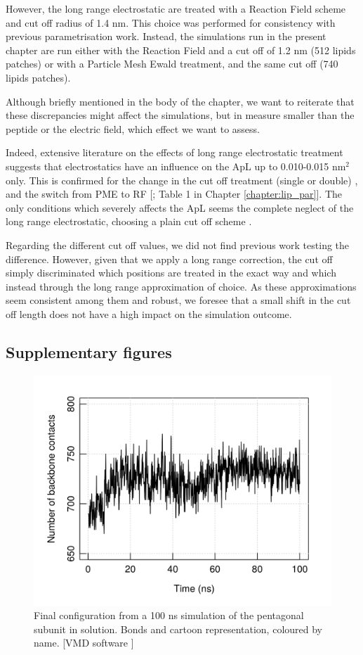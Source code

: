 However, the long range electrostatic are treated with a Reaction Field scheme and cut off radius of 1.4 nm. This choice was performed for consistency with previous parametrisation work.
%
Instead, the simulations run in the present chapter are run either with the Reaction Field and a cut off of 1.2 nm (512 lipids patches) or with a Particle Mesh Ewald treatment, and the same cut off (740 lipids patches).

Although briefly mentioned in the body of the chapter, we want to reiterate that these discrepancies might affect the simulations, but in measure smaller than the peptide or the electric field, which effect we want to assess.

Indeed, extensive literature on the effects of long range electrostatic treatment suggests that electrostatics have an influence on the ApL up to 0.010-0.015 nm$^2$ only. This is confirmed for the change in the cut off treatment (single or double) \citep{Silva2018,Reisser2017}, and the switch from PME to RF [\citet{Poger2012}; Table 1 in Chapter \ref{chapter:lip_par}].
%
The only conditions which severely affects the ApL seems the complete neglect of the long range electrostatic, choosing a plain cut off scheme \citep{Patra2003}.

Regarding the different cut off values, we did not find previous work testing the difference. However, given that we apply a long range correction, the cut off simply discriminated which positions are treated in the exact way and which instead through the long range approximation of choice. As these approximations seem consistent among them and robust, we foresee that a small shift in the cut off length does not have a high impact on the simulation outcome.


\subsection{Supplementary figures}
\begin{figure}[h!]
\centering
\includegraphics[width=0.6\linewidth]{3results_capsule/pics/bb_contacts.png}
\caption[Final configuration of a pentagonal subunit simulation]{Final configuration from a 100 ns simulation of the pentagonal subunit in solution. Bonds and cartoon representation, coloured by name. [VMD software \citet{HUMP96}]}
\label{fig:penta_results_SI}
\end{figure}

